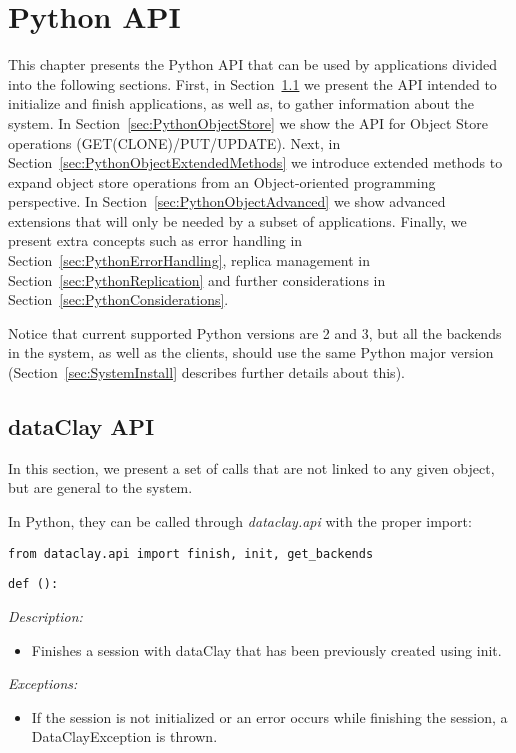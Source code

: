 
\chapter{Python API}
\label{sec:PythonAPI}

This chapter presents the Python API that can be used by applications divided into the following sections. First, in Section~\ref{sec:PythonGlobalAPI} we present the API intended to initialize and finish applications, as well as, to gather information about the system. In Section~\ref{sec:PythonObjectStore} we show the API for Object Store operations (GET(CLONE)/PUT/UPDATE). Next, in Section~\ref{sec:PythonObjectExtendedMethods} we introduce extended methods to expand object store operations from an Object-oriented programming perspective. In Section~\ref{sec:PythonObjectAdvanced} we show advanced extensions that will only be needed by a subset of applications. Finally, we present extra concepts such as error handling in Section~\ref{sec:PythonErrorHandling}, replica management in Section~\ref{sec:PythonReplication} and further considerations in Section~\ref{sec:PythonConsiderations}.

Notice that current supported Python versions are 2 and 3, but all the backends in the system, as well as the clients, should use the same Python major version (Section~\ref{sec:SystemInstall} describes further details about this).

\section{dataClay API}
\label{sec:PythonGlobalAPI}

In this section, we present a set of calls that are not linked to any given object, but are general to the system.

In Python, they can be called through \textit{dataclay.api} with the proper import:

\colorbox{basecolor!15}{\texttt{from dataclay.api import finish, init, get\_backends}}



\begin{dBox}
\texttt{def ():}
\LINE

{\it Description:}

\begin{itemize}
    \item Finishes a session with dataClay that has been previously created using init.
\end{itemize}

{\it Exceptions:}

\begin{itemize}
    \item If the session is not initialized or an error occurs while finishing the session, a DataClayException is thrown.
\end{itemize}
 
\end{dBox}


